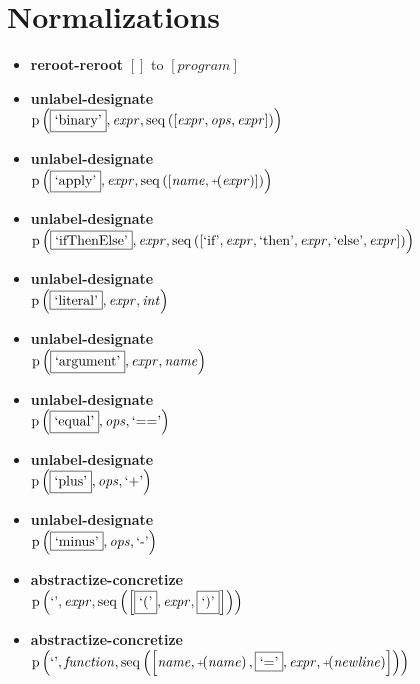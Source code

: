 \section{Normalizations}
{\footnotesize\begin{itemize}
\item \textbf{reroot-reroot} $\left[\right]$ to $\left[\mathit{program}\right]$
\item \textbf{unlabel-designate}\\$\mathrm{p}\left(\fbox{\text{`binary'}},\mathit{expr},\mathrm{seq}\left(\left[\mathit{expr}, \mathit{ops}, \mathit{expr}\right]\right)\right)$
\item \textbf{unlabel-designate}\\$\mathrm{p}\left(\fbox{\text{`apply'}},\mathit{expr},\mathrm{seq}\left(\left[\mathit{name}, \plus \left(\mathit{expr}\right)\right]\right)\right)$
\item \textbf{unlabel-designate}\\$\mathrm{p}\left(\fbox{\text{`ifThenElse'}},\mathit{expr},\mathrm{seq}\left(\left[\text{`if'}, \mathit{expr}, \text{`then'}, \mathit{expr}, \text{`else'}, \mathit{expr}\right]\right)\right)$
\item \textbf{unlabel-designate}\\$\mathrm{p}\left(\fbox{\text{`literal'}},\mathit{expr},\mathit{int}\right)$
\item \textbf{unlabel-designate}\\$\mathrm{p}\left(\fbox{\text{`argument'}},\mathit{expr},\mathit{name}\right)$
\item \textbf{unlabel-designate}\\$\mathrm{p}\left(\fbox{\text{`equal'}},\mathit{ops},\text{`=='}\right)$
\item \textbf{unlabel-designate}\\$\mathrm{p}\left(\fbox{\text{`plus'}},\mathit{ops},\text{`+'}\right)$
\item \textbf{unlabel-designate}\\$\mathrm{p}\left(\fbox{\text{`minus'}},\mathit{ops},\text{`-'}\right)$
\item \textbf{abstractize-concretize}\\$\mathrm{p}\left(\text{`'},\mathit{expr},\mathrm{seq}\left(\left[\fbox{$\text{`('}$}, \mathit{expr}, \fbox{$\text{`)'}$}\right]\right)\right)$
\item \textbf{abstractize-concretize}\\$\mathrm{p}\left(\text{`'},\mathit{function},\mathrm{seq}\left(\left[\mathit{name}, \plus \left(\mathit{name}\right), \fbox{$\text{`='}$}, \mathit{expr}, \plus \left(\mathit{newline}\right)\right]\right)\right)$

\end{itemize}}
